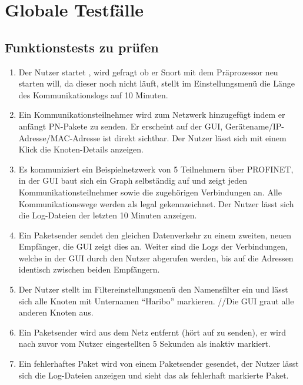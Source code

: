 \chapter{Globale Testfälle}

\section{Funktionstests zu prüfen}

\begin{enumerate}
  \item {} Der Nutzer startet \programname, wird gefragt ob er Snort mit dem Präprozessor neu starten will, da dieser noch nicht läuft, stellt im Einstellungsmenü die Länge des Kommunikationslogs auf 10 Minuten.
  \item {} Ein Kommunikationsteilnehmer wird zum Netzwerk hinzugefügt indem er anfängt PN-Pakete zu senden. Er erscheint auf der GUI, Gerätename/IP-Adresse/MAC-Adresse ist direkt sichtbar. Der Nutzer lässt sich mit einem Klick die Knoten-Details anzeigen.
  \item {} Es kommuniziert ein Beispielnetzwerk von 5 Teilnehmern über PROFINET, in der GUI baut sich ein Graph selbständig auf und zeigt jeden Kommunikationsteilnehmer sowie die zugehörigen Verbindungen an. Alle Kommunikationswege werden als legal gekennzeichnet. Der Nutzer lässt sich die Log-Dateien der letzten 10 Minuten anzeigen.
  \item {}Ein Paketsender sendet den gleichen Datenverkehr zu einem zweiten, neuen Empfänger, die GUI zeigt dies an. Weiter sind die Logs der Verbindungen, welche in der GUI durch den Nutzer abgerufen werden, bis auf die Adressen identisch zwischen beiden Empfängern.
  \item {} Der Nutzer stellt im Filtereinstellungsmenü den Namensfilter ein und lässt sich alle Knoten mit Unternamen “Haribo” markieren. //Die GUI graut alle anderen Knoten aus.
  \item {} Ein Paketsender wird aus dem Netz entfernt (hört auf zu senden), er wird nach zuvor vom Nutzer eingestellten 5 Sekunden als inaktiv markiert.
  \item {}Ein fehlerhaftes Paket wird von einem Paketsender gesendet, der Nutzer lässt sich die Log-Dateien anzeigen und sieht das als fehlerhaft markierte Paket.

\end{enumerate}
